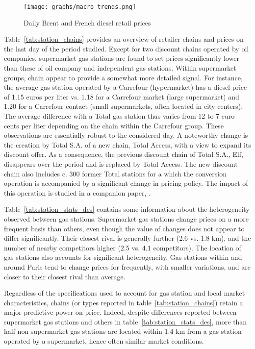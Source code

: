 \documentclass[english]{article}
\begin{document}
\begin{figure}[H]
    \caption{Daily Brent and French diesel retail prices}
	\centering
		\texttt{[image: graphs/macro\_trends.png]}
\label{fig:brent_and_diesel}
\end{figure}

Table~\ref{tab:station_chains} provides an overview of retailer chains and prices on the last day of the period studied. Except for two discount chains operated by oil companies, supermarket gas stations are found to set prices significantly lower than these of oil company and independent gas stations. Within supermarket groups, chain appear to provide a somewhat more detailed signal. For instance, the average gas station operated by a Carrefour (hypermarket) has a diesel price of 1.15 euros per liter vs. 1.18 for a Carrefour market (large supermarket) and 1.20 for a Carrefour contact (small supermarkets, often located in city centers). The average difference with a Total gas station thus varies from 12 to 7 euro cents per liter depending on the chain within the Carrefour group. These observations are essentially robust to the considered day. A noteworthy change is the creation by Total S.A. of a new chain, Total Access, with a view to expand its discount offer. As a consequence, the previous discount chain of Total S.A., Elf, disappears over the period and is replaced by Total Access. The new discount chain also includes c. 300 former Total stations for a which the conversion operation is accompanied by a significant change in pricing policy. The impact of this operation is studied in a companion paper, \cite{CHA16}.

Table~\ref{tab:station_stats_des} contains some information about the heterogeneity observed between gas stations. Supermarket gas stations change prices on a more frequent basis than others, even though the value of changes does not appear to differ significantly. Their closest rival is generally further (2.6 vs. 1.8 km), and the number of nearby competitors higher (2.5 vs. 4.1 competitors). The location of gas stations also accounts for significant heterogeneity. Gas stations within and around Paris tend to change prices for frequently, with smaller variations, and are closer to their closest rival than average.

Regardless of the specifications used to account for gas station and local market characteristics, chains (or types reported in table~\ref{tab:station_chains}) retain a major predictive power on price. Indeed, despite differences reported between supermarket gas stations and others in table~\ref{tab:station_stats_des}, more than half non supermarket gas stations are located within 1.4 km from a gas station operated by a supermarket, hence often similar market conditions.
\end{document}

